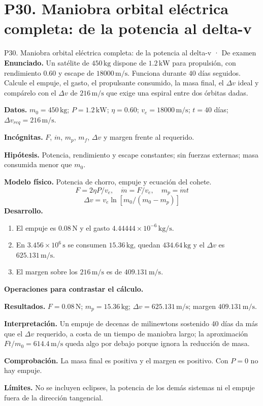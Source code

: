 \section{P30. Maniobra orbital eléctrica completa: de la potencia al delta-v}
\begin{studiumworked}{P30. Maniobra orbital eléctrica completa: de la potencia al delta-v · De examen}
\textbf{Enunciado.} Un satélite de $450\,\mathrm{kg}$ dispone de $1.2\,\mathrm{kW}$ para propulsión, con rendimiento $0.60$ y escape de $18000\,\mathrm{m/s}$. Funciona durante $40$ días seguidos. Calcule el empuje, el gasto, el propulsante consumido, la masa final, el $\Delta v$ ideal y compárelo con el $\Delta v$ de $216\,\mathrm{m/s}$ que exige una espiral entre dos órbitas dadas.

\textbf{Datos.} $m_0=450\,\mathrm{kg}$; $P=1.2\,\mathrm{kW}$; $\eta=0.60$; $v_e=18000\,\mathrm{m/s}$; $t=40$ días; $\Delta v_{req}=216\,\mathrm{m/s}$.

\textbf{Incógnitas.} $F$, $\dot m$, $m_p$, $m_f$, $\Delta v$ y margen frente al requerido.

\textbf{Hipótesis.} Potencia, rendimiento y escape constantes; sin fuerzas externas; masa consumida menor que $m_0$.

\textbf{Modelo físico.} Potencia de chorro, empuje y ecuación del cohete.
\[F=2\eta P/v_e,\quad \dot m=F/v_e,\quad m_p=\dot mt\]
\[\Delta v=v_e\ln[m_0/(m_0-m_p)]\]
\textbf{Desarrollo.}
\begin{enumerate}
\item El empuje es $0.08\,\mathrm N$ y el gasto $4.44444\times10^{-6}\,\mathrm{kg/s}$.
\item En $3.456\times10^{6}\,\mathrm s$ se consumen $15.36\,\mathrm{kg}$, quedan $434.64\,\mathrm{kg}$ y el $\Delta v$ es $625.131\,\mathrm{m/s}$.
\item El margen sobre los $216\,\mathrm{m/s}$ es de $409.131\,\mathrm{m/s}$.
\end{enumerate}
\textbf{Operaciones para contrastar el cálculo.}

\textbf{Resultados.} $F=0.08\,\mathrm N$; $m_p=15.36\,\mathrm{kg}$; $\Delta v=625.131\,\mathrm{m/s}$; margen $409.131\,\mathrm{m/s}$.

\textbf{Interpretación.} Un empuje de decenas de milinewtons sostenido 40 días da más que el $\Delta v$ requerido, a costa de un tiempo de maniobra largo; la aproximación $Ft/m_0=614.4\,\mathrm{m/s}$ queda algo por debajo porque ignora la reducción de masa.

\textbf{Comprobación.} La masa final es positiva y el margen es positivo. Con $P=0$ no hay empuje.

\textbf{Límites.} No se incluyen eclipses, la potencia de los demás sistemas ni el empuje fuera de la dirección tangencial.
\end{studiumworked}
